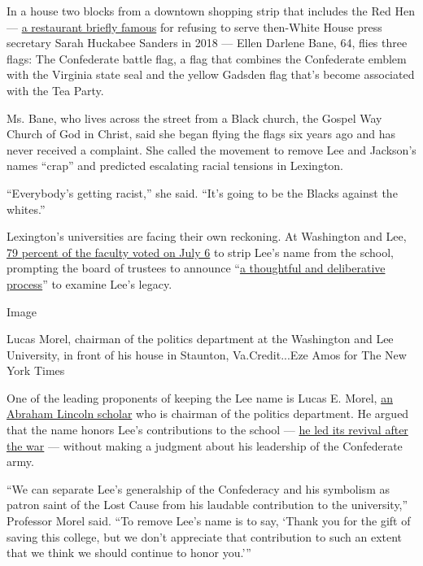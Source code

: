 In a house two blocks from a downtown shopping strip that includes the
Red Hen ---
\href{https://www.nytimes3xbfgragh.onion/2018/06/23/us/politics/sarah-huckabee-sanders-restaurant.html}{a
restaurant briefly famous} for refusing to serve then-White House press
secretary Sarah Huckabee Sanders in 2018 --- Ellen Darlene Bane, 64,
flies three flags: The Confederate battle flag, a flag that combines the
Confederate emblem with the Virginia state seal and the yellow Gadsden
flag that's become associated with the Tea Party.

Ms. Bane, who lives across the street from a Black church, the Gospel
Way Church of God in Christ, said she began flying the flags six years
ago and has never received a complaint. She called the movement to
remove Lee and Jackson's names ``crap'' and predicted escalating racial
tensions in Lexington.

``Everybody's getting racist,'' she said. ``It's going to be the Blacks
against the whites.''

Lexington's universities are facing their own reckoning. At Washington
and Lee,
\href{https://www.washingtonpost.com/education/2020/07/06/faculty-resoundingly-votes-change-name-washington-lee/}{79
percent of the faculty voted on July 6} to strip Lee's name from the
school, prompting the board of trustees to announce
``\href{https://www.wlu.edu/the-w-l-story/leadership/board-of-trustees/messages-from-the-board/}{a
thoughtful and deliberative process}'' to examine Lee's legacy.

Image

Lucas Morel, chairman of the politics department at the Washington and
Lee University, in front of his house in Staunton, Va.Credit...Eze Amos
for The New York Times

One of the leading proponents of keeping the Lee name is Lucas E. Morel,
\href{https://my.wlu.edu/directory/profile?ID=x1338}{an Abraham Lincoln
scholar} who is chairman of the politics department. He argued that the
name honors Lee's contributions to the school ---
\href{https://www.wlu.edu/the-w-l-story/university-history/}{he led its
revival after the war} --- without making a judgment about his
leadership of the Confederate army.

``We can separate Lee's generalship of the Confederacy and his symbolism
as patron saint of the Lost Cause from his laudable contribution to the
university,'' Professor Morel said. ``To remove Lee's name is to say,
`Thank you for the gift of saving this college, but we don't appreciate
that contribution to such an extent that we think we should continue to
honor you.'''


